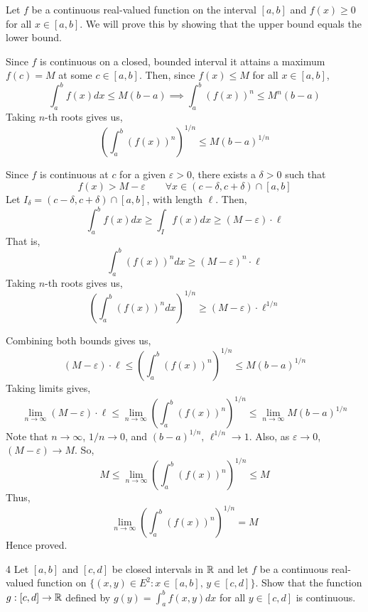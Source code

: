\documentclass[12pt]{article}
\begin{document}
\begin{solution}
    \bbni

    Let $f$ be a continuous real-valued function on the interval $[a, b]$ and $f(x) \geq 0$ for all $x \in [a,b]$. We will prove this by showing that the upper bound equals the lower bound. 

    Since $f$ is continuous on a closed, bounded interval it attains a maximum $f(c) = M$ at some $c \in [a,b]$. Then, since $f(x) \leq M$ for all $x \in [a,b]$, 
    \[\int_a^b f(x) dx \leq M(b-a) \implies \int_a^b(f(x))^n \leq M^n(b-a)\]
    Taking $n$-th roots gives us, 
    \[\left(\int_a^b(f(x))^n\right)^{1/n} \leq M(b-a)^{1/n}\]


    Since $f$ is continuous at $c$ for a given $\varepsilon > 0$, there exists a $\delta >0$ such that 
    \[f(x) > M - \varepsilon \qquad \forall x \in (c - \delta, c + \delta) \cap [a,b]\]
    Let $I_\delta = (c - \delta, c + \delta) \cap [a,b]$, with length $\ell$. Then, 
    \[\int_a^b f(x) dx \geq \int_{I}f( x) dx \geq (M-\varepsilon) \cdot \ell\]
    That is, 
    \[\int_a^b (f(x))^n dx \geq  (M-\varepsilon)^n \cdot \ell\]
    Taking $n$-th roots gives us, 
    \[\left( \int_a^b (f(x))^n dx \right)^{1/n}\geq (M-\varepsilon)\cdot \ell^{1/n}\]

    Combining both bounds gives us,
    \[(M - \varepsilon)\cdot \ell \leq \left(\int_a^b(f(x))^n\right)^{1/n} \leq M(b-a)^{1/n}\]
    Taking limits gives, 
    \[\underset{n \to \infty}{\lim}{(M - \varepsilon)\cdot \ell} \leq \underset{n\to \infty}{\lim}{\left(\int_a^b(f(x))^n\right)^{1/n}} \leq \underset{n\to \infty}{\lim}{M(b-a)^{1/n}}\]
    Note that $n \to \infty$, $1/n \to 0$, and $(b-a)^{1/n}, \, \ell^{1/n} \to 1$. Also, as $\varepsilon \to 0$, $(M - \varepsilon) \to M$.
    So, 
    \[M \leq \underset{n\to \infty}{\lim}{\left(\int_a^b(f(x))^n\right)^{1/n}} \leq M\]
    Thus, 
    \[\underset{n\to \infty}{\lim}{\left(\int_a^b(f(x))^n\right)^{1/n}} = M\]
    Hence proved.
\end{solution}


\newpage 

\begin{problem}{4}
     Let $[a, b]$ and $[c, d]$ be closed intervals in $\mathbb R$ and let $f$ be a continuous real-valued function on $\{(x,y) \in E^2: x \in [a,b], \, y\in [c,d]\}$. Show that the function $g:[c,d] \to \mathbb R$ defined by $g(y) = \int_a^bf(x,y)dx$ for all $y \in [c,d]$ is continuous.
\end{problem}
\end{document}
